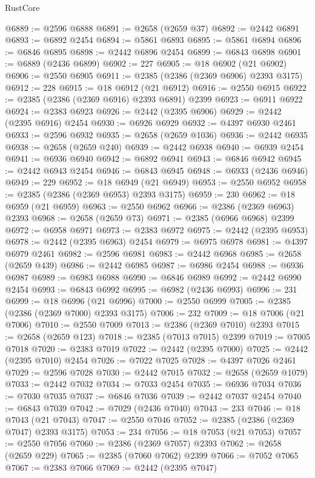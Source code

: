 \begin{lexlean}{RustCore}
\begin{coremodule}
@6889 := @2596 @6888
@6891 := @2658 (@2659 @37)
@6892 := @2442 @6891
@6893 := @6892 @2454
@6894 := @5861 @6893
@6895 := @5861 @6894
@6896 := @6846 @6895
@6898 := @2442 @6896 @2454
@6899 := @6843 @6898
@6901 := @6889 (@2436 @6899)
@6902 := 227
@6905 := @18 @6902 (@21 @6902)
@6906 := @2550 @6905
@6911 := @2385 (@2386 (@2369 @6906) @2393 @3175)
@6912 := 228
@6915 := @18 @6912 (@21 @6912)
@6916 := @2550 @6915
@6922 := @2385 (@2386 (@2369 @6916) @2393 @6891) @2399
@6923 := @6911 @6922
@6924 := @2383 @6923
@6926 := @2442 (@2395 @6906)
@6929 := @2442 (@2395 @6916) @2454
@6930 := @6926 @6929
@6932 := @4397 @6930 @2461
@6933 := @2596 @6932
@6935 := @2658 (@2659 @1036)
@6936 := @2442 @6935
@6938 := @2658 (@2659 @240)
@6939 := @2442 @6938
@6940 := @6939 @2454
@6941 := @6936 @6940
@6942 := @6892 @6941
@6943 := @6846 @6942
@6945 := @2442 @6943 @2454
@6946 := @6843 @6945
@6948 := @6933 (@2436 @6946)
@6949 := 229
@6952 := @18 @6949 (@21 @6949)
@6953 := @2550 @6952
@6958 := @2385 (@2386 (@2369 @6953) @2393 @3175)
@6959 := 230
@6962 := @18 @6959 (@21 @6959)
@6963 := @2550 @6962
@6966 := @2386 (@2369 @6963) @2393
@6968 := @2658 (@2659 @73)
@6971 := @2385 (@6966 @6968) @2399
@6972 := @6958 @6971
@6973 := @2383 @6972
@6975 := @2442 (@2395 @6953)
@6978 := @2442 (@2395 @6963) @2454
@6979 := @6975 @6978
@6981 := @4397 @6979 @2461
@6982 := @2596 @6981
@6983 := @2442 @6968
@6985 := @2658 (@2659 @439)
@6986 := @2442 @6985
@6987 := @6986 @2454
@6988 := @6936 @6987
@6989 := @6983 @6988
@6990 := @6846 @6989
@6992 := @2442 @6990 @2454
@6993 := @6843 @6992
@6995 := @6982 (@2436 @6993)
@6996 := 231
@6999 := @18 @6996 (@21 @6996)
@7000 := @2550 @6999
@7005 := @2385 (@2386 (@2369 @7000) @2393 @3175)
@7006 := 232
@7009 := @18 @7006 (@21 @7006)
@7010 := @2550 @7009
@7013 := @2386 (@2369 @7010) @2393
@7015 := @2658 (@2659 @123)
@7018 := @2385 (@7013 @7015) @2399
@7019 := @7005 @7018
@7020 := @2383 @7019
@7022 := @2442 (@2395 @7000)
@7025 := @2442 (@2395 @7010) @2454
@7026 := @7022 @7025
@7028 := @4397 @7026 @2461
@7029 := @2596 @7028
@7030 := @2442 @7015
@7032 := @2658 (@2659 @1079)
@7033 := @2442 @7032
@7034 := @7033 @2454
@7035 := @6936 @7034
@7036 := @7030 @7035
@7037 := @6846 @7036
@7039 := @2442 @7037 @2454
@7040 := @6843 @7039
@7042 := @7029 (@2436 @7040)
@7043 := 233
@7046 := @18 @7043 (@21 @7043)
@7047 := @2550 @7046
@7052 := @2385 (@2386 (@2369 @7047) @2393 @3175)
@7053 := 234
@7056 := @18 @7053 (@21 @7053)
@7057 := @2550 @7056
@7060 := @2386 (@2369 @7057) @2393
@7062 := @2658 (@2659 @229)
@7065 := @2385 (@7060 @7062) @2399
@7066 := @7052 @7065
@7067 := @2383 @7066
@7069 := @2442 (@2395 @7047)

\end{coremodule}
\end{lexlean}
